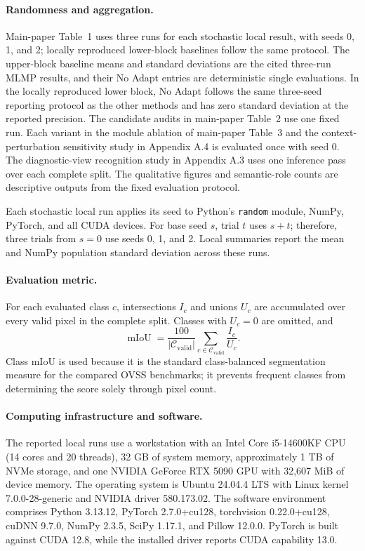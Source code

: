 \documentclass[letterpaper]{article}
\begin{document}
\paragraph{Randomness and aggregation.}
Main-paper Table~1 uses three runs for each stochastic local result, with seeds 0, 1, and 2; locally reproduced lower-block baselines follow the same protocol. The upper-block baseline means and standard deviations are the cited three-run MLMP results, and their No Adapt entries are deterministic single evaluations. In the locally reproduced lower block, No Adapt follows the same three-seed reporting protocol as the other methods and has zero standard deviation at the reported precision. The candidate audits in main-paper Table~2 use one fixed run. Each variant in the module ablation of main-paper Table~3 and the context-perturbation sensitivity study in Appendix A.4 is evaluated once with seed 0. The diagnostic-view recognition study in Appendix A.3 uses one inference pass over each complete split. The qualitative figures and semantic-role counts are descriptive outputs from the fixed evaluation protocol.

Each stochastic local run applies its seed to Python's \texttt{random} module, NumPy, PyTorch, and all CUDA devices. For base seed $s$, trial $t$ uses $s+t$; therefore, three trials from $s=0$ use seeds 0, 1, and 2. Local summaries report the mean and NumPy population standard deviation across these runs.

\paragraph{Evaluation metric.}
For each evaluated class $c$, intersections $I_c$ and unions $U_c$ are accumulated over every valid pixel in the complete split. Classes with $U_c=0$ are omitted, and
\begin{equation}
    \operatorname{mIoU}
    =
    \frac{100}{|\mathcal C_{\mathrm{valid}}|}
    \sum_{c\in\mathcal C_{\mathrm{valid}}}
    \frac{I_c}{U_c}.
\end{equation}
Class mIoU is used because it is the standard class-balanced segmentation measure for the compared OVSS benchmarks; it prevents frequent classes from determining the score solely through pixel count.

\paragraph{Computing infrastructure and software.}
The reported local runs use a workstation with an Intel Core i5-14600KF CPU (14 cores and 20 threads), 32 GB of system memory, approximately 1 TB of NVMe storage, and one NVIDIA GeForce RTX 5090 GPU with 32,607 MiB of device memory. The operating system is Ubuntu 24.04.4 LTS with Linux kernel 7.0.0-28-generic and NVIDIA driver 580.173.02. The software environment comprises Python 3.13.12, PyTorch 2.7.0+cu128, torchvision 0.22.0+cu128, cuDNN 9.7.0, NumPy 2.3.5, SciPy 1.17.1, and Pillow 12.0.0. PyTorch is built against CUDA 12.8, while the installed driver reports CUDA capability 13.0.
\end{document}
